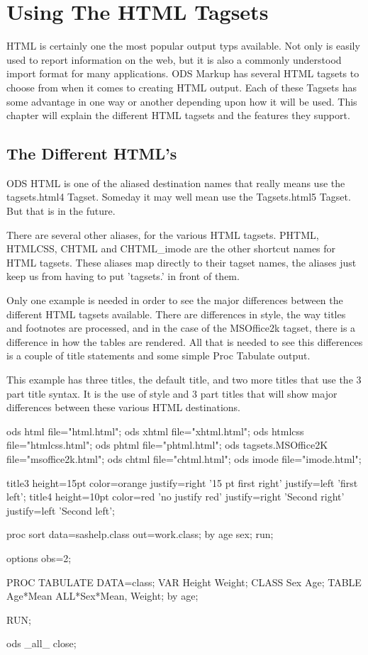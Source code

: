 \chapter{Using The HTML Tagsets}
HTML is certainly one the most popular output typs available.
Not only is easily used to report information on the web, but it
is also a commonly understood import format for many applications.
ODS Markup has several HTML tagsets to choose from when it comes
to creating HTML output.  Each of these Tagsets has some advantage
in one way or another depending upon how it will be used.
This chapter will explain the different HTML tagsets and the
features they support.


\section{The Different HTML's}
ODS HTML is one of the aliased destination names that really 
means use the tagsets.html4 Tagset.  Someday it may well mean
use the Tagsets.html5 Tagset.  But that is in the future.

There are several other aliases, for the various HTML tagsets.
PHTML, HTMLCSS, CHTML and CHTML\_imode are the 
other shortcut names for HTML tagsets.  These aliases map directly
to their tagset names, the aliases just keep us from having to put 'tagsets.'
in front of them.

Only one example is needed in order to
see the major differences between the different HTML tagsets available.
There are differences in style, the way titles and footnotes are processed,
and in the case of the MSOffice2k tagset, there is a difference in how the
tables are rendered.  All that is needed to see this differences is a 
couple of title statements and some simple Proc Tabulate output.

This example has three titles, the default title, and two more titles that
use the 3 part title syntax.  It is the use of style and 3 part titles that
will show major differences between these various HTML destinations.  

\begin{sfvcode}
ods html file="html.html";
ods xhtml file="xhtml.html";
ods htmlcss file="htmlcss.html";
ods phtml file="phtml.html";
ods tagsets.MSOffice2K file="msoffice2k.html";
ods chtml file="chtml.html";
ods imode file="imode.html";


  title3 height=15pt color=orange
         justify=right '15 pt first right'
         justify=left 'first left';
  title4 height=10pt color=red 'no justify red'
         justify=right 'Second right'
         justify=left 'Second left';

proc sort data=sashelp.class out=work.class;
    by age  sex;
run;

options obs=2;

PROC TABULATE DATA=class;
   VAR Height Weight;
   CLASS Sex Age;
   TABLE Age*Mean ALL*Sex*Mean,
         Weight;
   by age;
   
RUN;

ods _all_ close;
\end{sfvcode}


